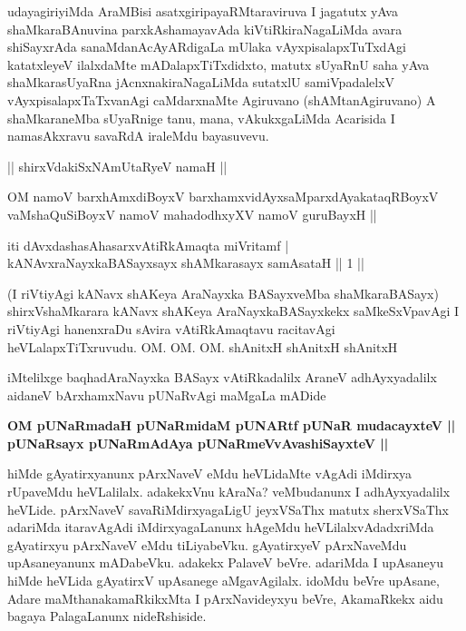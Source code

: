 \begin{artha}
udayagiriyiMda AraMBisi asatxgiripayaRMtaraviruva I jagatutx yAva 
shaMkaraBAnuvina parxkAshamayavAda kiVtiRkiraNagaLiMda avara 
shiSayxrAda sanaMdanA\-cAyARdigaLa mUlaka vAyxpisalapxTuTxdAgi 
katatxleyeV ilalxdaMte mADalapxTiTxdidxto, matutx sUyaRnU saha yAva 
shaMkarasUyaRna jAcnxnakiraNagaLiMda sutatxlU samiVpadalelxV 
vAyxpisalapxTaTxvanAgi caMdarxnaMte Agiruvano (shAMtanAgiruvano) A 
shaMkaraneMba sUyaRnige tanu, mana, vAkukxgaLiMda Acarisida I 
namasAkxravu savaRdA iraleMdu bayasuvevu.
\end{artha}

\begin{center}
|| shirxVdakiSxNAmUtaRyeV namaH ||
\end{center}

\begin{shl}
OM namoV barxhAmxdiBoyxV barxhamxvidAyxsaMparxdAyakataqRBoyxV \\
vaMshaQuSiBoyxV namoV mahadodhxyXV namoV guruBayxH ||
\end{shl}

\begin{shl}
iti dAvxdashasAhasarxvAtiRkAmaqta miVritamf |\\
kANAvxraNayxkaBASayxsayx shAMkarasayx samAsataH \hfill|| 1 ||
\end{shl}

\begin{artha}
(I riVtiyAgi kANavx shAKeya AraNayxka BASayxveMba shaMkaraBASayx) 
shirxVshaMkarara kANavx shAKeya AraNayxkaBASayxkekx saMkeSxVpavAgi I 
riVtiyAgi hanenxraDu sAvira vAtiRkAmaqtavu racitavAgi 
heVLalapxTiTxruvudu. OM. OM. OM. shAnitxH shAnitxH shAnitxH
\end{artha}

\begin{center}
iMtelilxge baqhadAraNayxka BASayx vAtiRkadalilx AraneV adhAyxyadalilx 
aidaneV bArxhamxNavu pUNaRvAgi maMgaLa mADide
\end{center}

\begin{center}
\textbf{OM pUNaRmadaH pUNaRmidaM pUNARtf pUNaR mudacayxteV ||\\
pUNaRsayx pUNaRmAdAya pUNaRmeVvAvashiSayxteV ||} 
\end{center}

\centerline{}


\begin{artha}
hiMde gAyatirxyanunx pArxNaveV eMdu heVLidaMte vAgAdi iMdirxya rUpaveMdu heVLalilalx. adakekxVnu kAraNa? veMbudanunx I adhAyxyadalilx heVLide. pArxNaveV savaRiMdirxyagaLigU jeyxVSaThx matutx sherxVSaThx adariMda itaravAgAdi iMdirxyagaLanunx hAgeMdu heVLilalxvAdadxriMda gAyatirxyu pArxNaveV eMdu tiLiyabeVku. gAyatirxyeV pArxNaveMdu upAsaneyanunx mADabeVku. adakekx PalaveV beVre. adariMda I upAsaneyu hiMde heVLida gAyatirxV upAsanege aMgavAgilalx. idoMdu beVre upAsane, Adare maMthanakamaRkikxMta I pArxNavideyxyu beVre, AkamaRkekx aidu bagaya PalagaLanunx nideRshiside.
\end{artha}

